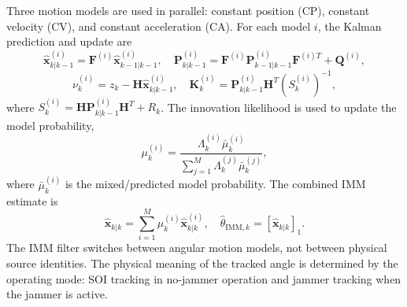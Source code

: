 \documentclass[conference]{IEEEtran}
\begin{document}
Three motion models are used in parallel: constant position (CP), constant velocity (CV), and constant acceleration (CA). For each model $i$, the Kalman prediction and update are
\begin{equation}
\hat{\mathbf{x}}_{k|k-1}^{(i)}=\mathbf{F}^{(i)}\hat{\mathbf{x}}_{k-1|k-1}^{(i)}, \quad
\mathbf{P}_{k|k-1}^{(i)}=\mathbf{F}^{(i)}\mathbf{P}_{k-1|k-1}^{(i)}\mathbf{F}^{(i)T}+\mathbf{Q}^{(i)},
\label{eq:kf_predict}
\end{equation}
\begin{equation}
\nu_k^{(i)}=z_k-\mathbf{H}\hat{\mathbf{x}}_{k|k-1}^{(i)}, \quad
\mathbf{K}_k^{(i)}=\mathbf{P}_{k|k-1}^{(i)}\mathbf{H}^{T}\left(S_k^{(i)}\right)^{-1},
\label{eq:kf_innov_gain}
\end{equation}
where $S_k^{(i)}=\mathbf{H}\mathbf{P}_{k|k-1}^{(i)}\mathbf{H}^{T}+R_k$. The innovation likelihood is used to update the model probability,
\begin{equation}
\mu_k^{(i)}=\frac{\Lambda_k^{(i)}\bar{\mu}_k^{(i)}}{\sum_{j=1}^{M}\Lambda_k^{(j)}\bar{\mu}_k^{(j)}},
\label{eq:model_probability}
\end{equation}
where $\bar{\mu}_k^{(i)}$ is the mixed/predicted model probability. The combined IMM estimate is
\begin{equation}
\hat{\mathbf{x}}_{k|k}=\sum_{i=1}^{M}\mu_k^{(i)}\hat{\mathbf{x}}_{k|k}^{(i)}, \quad
\hat{\theta}_{\mathrm{IMM},k}=\left[\hat{\mathbf{x}}_{k|k}\right]_1.
\label{eq:imm_output}
\end{equation}
The IMM filter switches between angular motion models, not between physical source identities. The physical meaning of the tracked angle is determined by the operating mode: SOI tracking in no-jammer operation and jammer tracking when the jammer is active.
\end{document}
